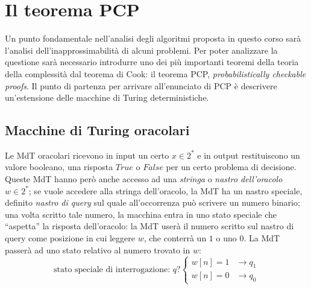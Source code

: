 \section{Il teorema PCP}
Un punto fondamentale nell'analisi degli algoritmi proposta in questo corso sarà
l'analisi dell'inapprossimabilità di alcuni problemi. Per poter analizzare la questione
sarà necessario introdurre uno dei più importanti teoremi della teoria della complessità
dal teorema di Cook: il teorema PCP, \textit{probabilistically checkable proofs}.
Il punto di partenza per arrivare all'enunciato di PCP è descrivere un'estensione delle
macchine di Turing deterministiche.

\subsection{Macchine di Turing oracolari}
Le MdT oracolari ricevono in input un certo $x \in 2^*$ e in output restituiscono
un valore booleano, una risposta $True$ o $False$ per un certo problema di decisione.
Queste MdT hanno però anche accesso ad una \textit{stringa} o
\textit{nastro dell'oracolo} $w \in 2^*$;
se vuole accedere alla stringa dell'oracolo, la MdT ha un nastro speciale,
definito \textit{nastro di query} sul quale all'occorrenza può scrivere un numero
binario; una volta scritto tale numero, la macchina entra in uno stato speciale
che ``aspetta'' la risposta dell'oracolo: la MdT userà il numero scritto sul nastro
di query come posizione in cui leggere $w$, che conterrà un $1$ o uno $0$.
La MdT passerà ad uno stato relativo al numero trovato in $w$:
$$
	\text{stato speciale di interrogazione: } q?
	\begin{cases}
		w[n] = 1 & \rightarrow q_1 \\
		w[n] = 0 & \rightarrow q_0
	\end{cases}
$$
